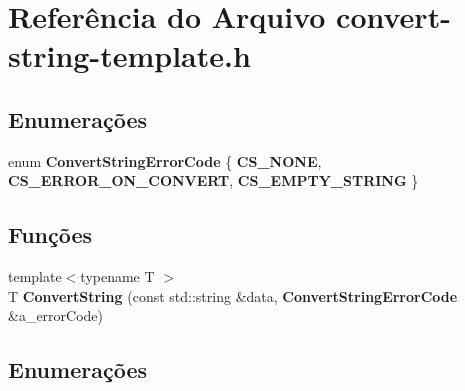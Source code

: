 \section{Referência do Arquivo convert-\/string-\/template.h}
\label{convert-string-template_8h}
\subsection*{Enumerações}
\begin{DoxyCompactItemize}
\item 
enum {\bf Convert\+String\+Error\+Code} \{ {\bf C\+S\+\_\+\+N\+O\+NE}, 
{\bf C\+S\+\_\+\+E\+R\+R\+O\+R\+\_\+\+O\+N\+\_\+\+C\+O\+N\+V\+E\+RT}, 
{\bf C\+S\+\_\+\+E\+M\+P\+T\+Y\+\_\+\+S\+T\+R\+I\+NG}
 \}
\end{DoxyCompactItemize}
\subsection*{Funções}
\begin{DoxyCompactItemize}
\item 
{\footnotesize template$<$typename T $>$ }\\T {\bf Convert\+String} (const std\+::string \&data, {\bf Convert\+String\+Error\+Code} \&a\+\_\+error\+Code)
\end{DoxyCompactItemize}


\subsection{Enumerações}
